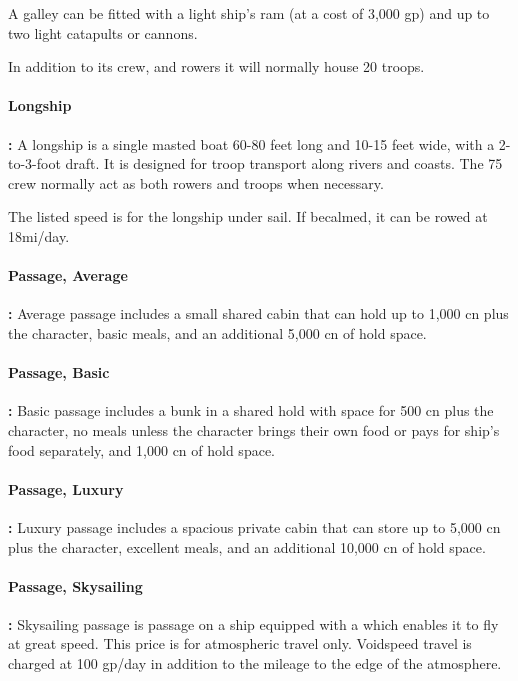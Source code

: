 \begin{multicols*}{2}
A galley can be fitted with a light ship’s ram (at a cost of 3,000 gp) and up to two light catapults or cannons.

In addition to its crew, and rowers it will normally house 20 troops.

\paragraph{Longship}\textbf{:} A longship is a single masted boat 60-80 feet long and 10-15 feet wide, with a 2-to-3-foot draft. It is designed for troop transport along rivers and coasts. The 75 crew normally act as both rowers and troops when necessary.

The listed speed is for the longship under sail. If becalmed, it can be rowed at 18mi/day.

\paragraph{Passage, Average}\textbf{:} Average passage includes a small shared cabin that can hold up to 1,000 cn plus the character, basic meals, and an additional 5,000 cn of hold space.

\paragraph{Passage, Basic}\textbf{:} Basic passage includes a bunk in a shared hold with space for 500 cn plus the character, no meals unless the character brings their own food or pays for ship’s food separately, and 1,000 cn of hold space.

\paragraph{Passage, Luxury}\textbf{:} Luxury passage includes a spacious private cabin that can store up to 5,000 cn plus the character, excellent meals, and an additional 10,000 cn of hold space.

\paragraph{Passage, Skysailing}\textbf{:} Skysailing passage is passage on a ship equipped with a  which enables it to fly at great speed. This price is for atmospheric travel only. Voidspeed travel is charged at 100 gp/day in addition to the mileage to the edge of the atmosphere.


\end{multicols*}
